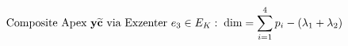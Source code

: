 \documentclass[preview]{standalone}
\begin{document}
\begin{align*}
\special{dvisvgm:raw <g id='unique000'>}\text{Composite Apex }\mathbf{y}\widetilde{\mathbf{c}}\text{ via Exzenter }e_3\in E_K:\; \text{dim} = \sum_{i=1}^4 p_i - (\lambda_1 + \lambda_2)\special{dvisvgm:raw </g>}
\end{align*}
\end{document}
